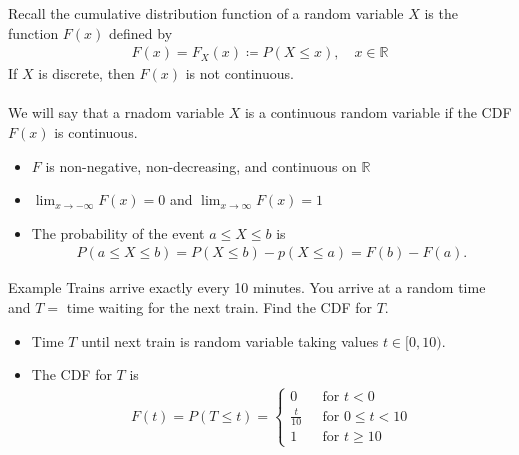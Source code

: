\documentclass{report}
\begin{document}
\begin{enumerate}
	 Recall the cumulative distribution function of a random variable $X$ is the function $F(x)$ defined by
	 \begin{align*}
	 	F(x) = F_X(x) \coloneq P(X \leq x), \quad x \in \mathbb{R}
	 \end{align*}
	 If $X$ is discrete, then $F(x)$ is not continuous.
	 \\ \\
	 We will say that a rnadom variable $X$ is a continuous random variable if the CDF $F(x)$ is continuous.
	 \begin{itemize}
	 	\item $F$ is non-negative, non-decreasing, and continuous on $\mathbb{R}$
		\item $\displaystyle \lim_{x\to -\infty} F(x) = 0$ and $\displaystyle \lim_{x\to \infty} F(x) = 1$
		\item The probability of the event $a \leq X \leq b$ is
			\begin{align*}
				P(a \leq X \leq b) = P(X \leq b) - p(X \leq a) = F(b) - F(a).
			\end{align*}
	 \end{itemize}

	 \begin{question}{Example}
	 	Trains arrive exactly every 10 minutes. You arrive at a random time and $T = $ time waiting for the next train. Find the CDF for $T$.
		\begin{itemize}
			\item Time $T$ until next train is random variable taking values $t \in [0, 10)$.
			\item The CDF for $T$ is
				\begin{align*}
					F(t) = P(T \leq t) = \begin{cases}
						0 \quad & \text{for } t < 0	\\
						\frac{t}{10} & \text{for } 0 \leq t < 10	\\
						1 & \text{for } t \geq 10
					\end{cases}
				\end{align*}
		\end{itemize}
	 \end{question}


\end{enumerate}
\end{document}
